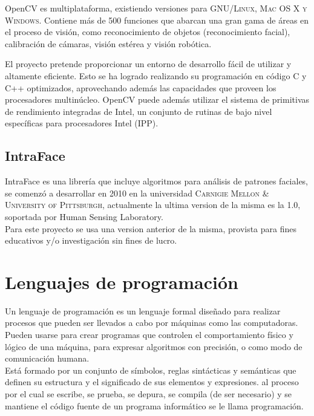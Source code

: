 \documentclass[12pt]{book} %
\begin{document}
		OpenCV es multiplataforma, existiendo versiones para \textsc{GNU/Linux, Mac OS X y Windows}. Contiene más de 500 funciones 
		que abarcan una gran gama de áreas en el proceso de visión, como reconocimiento de objetos (reconocimiento facial), 
		calibración de cámaras, visión estérea y visión robótica.
		
		El proyecto pretende proporcionar un entorno de desarrollo fácil de utilizar y altamente eficiente. Esto se ha logrado
		realizando su programación en código C y C++ optimizados, aprovechando además las capacidades que proveen los procesadores
		multinúcleo. OpenCV puede además utilizar el sistema de primitivas de rendimiento integradas de Intel, un conjunto de 
		rutinas de bajo nivel específicas para procesadores Intel \textsc{(IPP)}.
		
		
	\subsection{IntraFace \label{intraface}}
		IntraFace es una librería que incluye algoritmos para análisis de patrones faciales, se comenzó a desarrollar en 2010 en la
		universidad \textsc{Carnigie Mellon \& University of Pittsburgh}, actualmente la ultima version de la misma es la 1.0, soportada 
		por Human Sensing Laboratory.\\
		Para este proyecto se usa una version anterior de la misma, provista para fines educativos y/o investigación sin fines de lucro.

	
		
\newpage		
	
\section{Lenguajes de programación}
	
	Un lenguaje de programación es un lenguaje formal diseñado para realizar procesos que pueden ser llevados a cabo por máquinas como las computadoras.
	Pueden usarse para crear programas que controlen el comportamiento físico y lógico de una máquina, para expresar algoritmos con precisión, o como 
	modo de comunicación humana.\\
	Está formado por un conjunto de símbolos, reglas sintácticas y semánticas que definen su estructura y el significado de sus elementos y expresiones. 
	al proceso por el cual se escribe, se prueba, se depura, se compila (de ser necesario) y se mantiene el código fuente de un programa informático se 
	le llama programación.\\
	
\end{document}
